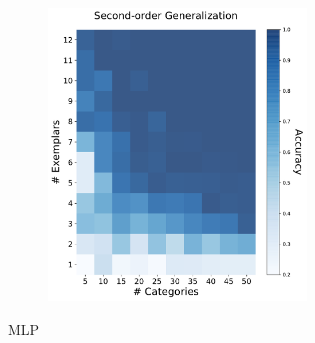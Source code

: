 \begin{figure}[h]
\begin{center}
\begin{subfigure}[b]{0.47\textwidth}
\begin{center}
\begin{subfigure}[b]{0.48\textwidth}
\begin{center}
                        \includegraphics[width=0.98\textwidth]{figures/mlp_2order_accuracy.pdf}
                    \end{center}
                \end{subfigure}
            \end{center}
            \caption{MLP}
            \label{fig:mlp_results}
        \end{subfigure}
        \begin{subfigure}[b]{0.47\textwidth}
            \begin{center}
                \begin{subfigure}[b]{0.48\textwidth}
                    \begin{center}

\end{center}
\end{subfigure}
\end{center}
\end{subfigure}
\end{center}
\end{figure}
